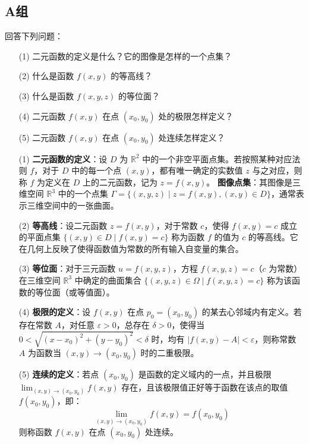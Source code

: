 \documentclass[lang=cn,11pt]{elegantbook}
\begin{document}
\subsection{A组}
\begin{exercise}[基本概念问答]
回答下列问题：
\begin{enumerate}
  \item[(1)] 二元函数的定义是什么？它的图像是怎样的一个点集？
  \item[(2)] 什么是函数 $f(x,y)$ 的等高线？
  \item[(3)] 什么是函数 $f(x,y,z)$ 的等位面？
  \item[(4)] 二元函数 $f(x,y)$ 在点 $(x_0,y_0)$ 处的极限怎样定义？
  \item[(5)] 二元函数 $f(x,y)$ 在点 $(x_0,y_0)$ 处连续怎样定义？
\end{enumerate}
\end{exercise}
\begin{solution}
\begin{enumerate}
  \item[(1)] \textbf{二元函数的定义}：设 $D$ 为 $\mathbb{R}^2$ 中的一个非空平面点集。若按照某种对应法则 $f$，对于 $D$ 中的每一个点 $(x,y)$，都有唯一确定的实数值 $z$ 与之对应，则称 $f$ 为定义在 $D$ 上的二元函数，记为 $z=f(x,y)$。
  \textbf{图像点集}：其图像是三维空间 $\mathbb{R}^3$ 中的一个点集 $\Gamma = \{(x,y,z) \mid z=f(x,y), (x,y) \in D\}$，通常表示三维空间中的一张曲面。
  \item[(2)] \textbf{等高线}：设二元函数 $z=f(x,y)$，对于常数 $c$，使得 $f(x,y)=c$ 成立的平面点集 $\{(x,y) \in D \mid f(x,y)=c\}$ 称为函数 $f$ 的值为 $c$ 的等高线。它在几何上反映了使得函数值为常数的所有输入自变量的集合。
  \item[(3)] \textbf{等位面}：对于三元函数 $u=f(x,y,z)$，方程 $f(x,y,z)=c$（$c$ 为常数）在三维空间 $\mathbb{R}^3$ 中确定的曲面集合 $\{(x,y,z) \in \Omega \mid f(x,y,z)=c\}$ 称为该函数的等位面（或等值面）。
  \item[(4)] \textbf{极限的定义}：设 $f(x,y)$ 在点 $p_0=(x_0,y_0)$ 的某去心邻域内有定义。若存在常数 $A$，对任意 $\varepsilon>0$，总存在 $\delta>0$，使得当 $0 < \sqrt{(x-x_0)^2+(y-y_0)^2} < \delta$ 时，均有 $|f(x,y)-A| < \varepsilon$，则称常数 $A$ 为函数当 $(x,y) \to (x_0,y_0)$ 时的二重极限。
  \item[(5)] \textbf{连续的定义}：若点 $(x_0,y_0)$ 是函数的定义域内的一点，并且极限 $\displaystyle\lim_{(x,y)\to(x_0,y_0)}f(x,y)$ 存在，且该极限值正好等于函数在该点的取值 $f(x_0,y_0)$，即：
  \[
  \lim_{(x,y)\to(x_0,y_0)}f(x,y) = f(x_0,y_0)
  \]
  则称函数 $f(x,y)$ 在点 $(x_0,y_0)$ 处连续。
\end{enumerate}
\end{solution}
\end{document}
